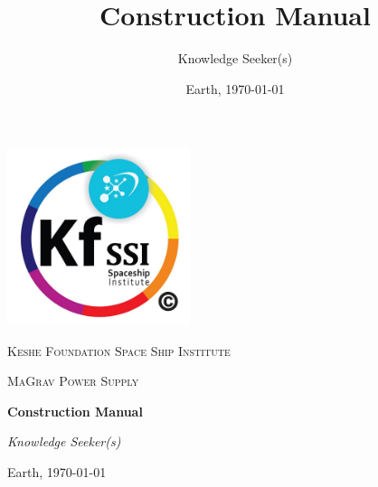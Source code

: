 \documentclass[
a4paper,     %
 headsepline, %
 footsepline, %
 titlepage,   %
 fleqn,       %
12pt         %
]{scrartcl}  %
\begin{document}
\subject{MaGrav Power Supply}
\title{Construction Manual}
\author{Knowledge Seeker(s)}
\date{Earth, \today}

\begin{titlepage}
	\centering
	\includegraphics[width=0.40\textwidth]{images/kf_ssi_logo.jpg}\par
	\vspace{3cm}
	{\scshape\LARGE Keshe Foundation Space Ship Institute \par}
	\vspace{1cm}
	{\scshape\large MaGrav Power Supply\par}
	\vspace{1.5cm}
	{\huge\bfseries Construction Manual\par}
	\vspace{2cm}
	{\large\itshape Knowledge Seeker(s)\par}
	\vfill


	{Earth, \today \par}
\end{titlepage}





 \tableofcontents

 \newpage
 \listoffigures

 \listoftables

 \newpage

\end{document}
